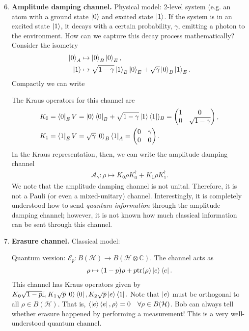 \documentclass[../../note.tex]{subfiles}
\begin{document}
\begin{enumerate}
\setcounter{enumi}{5}
    \item \textbf{Amplitude damping channel.} Physical model: 2-level system (e.g. an atom with a ground state $\ket{0}$ and excited state $\ket{1}$. If the system is in an excited state $\ket{1}$, it decays with a certain probability, $\gamma$, emitting a photon to the environment. How can we capture this decay process mathematically? Consider the isometry 
    \begin{align}
        \ket{0}_A &\mapsto \ket{0}_B \ket{0}_E,\\
        \ket{1} &\mapsto \sqrt{1-\gamma} \ket{1}_B \ket{0}_E +\sqrt{\gamma}\ket{0}_B\ket{1}_E.
    \end{align}
Compactly we can write

The Kraus operators for this channel are 
\begin{align}
    K_0 &=\bra{0}_E V = \ket{0}\bra{0}_B + \sqrt{1-\gamma} \ket{1}\bra{1})_B = \begin{pmatrix}
    1 & 0 \\
    0 & \sqrt{1-\gamma}
    \end{pmatrix},\\
     K_1&= \bra{1}_E V = \sqrt{\gamma}\ket{0}_B\bra{1}_A = \begin{pmatrix}
    0 & \gamma \\
    0 & 0
    \end{pmatrix}.
\end{align}
In the Kraus representation, then, we can write the amplitude damping channel 
\begin{align}
    \mathcal{A}_{\gamma}: \rho \mapsto K_0 \rho K_0^{\dagger} + K_1 \rho K_1^{\dagger}.
\end{align}
We note that the amplitude damping channel is not unital. Therefore, it is not a Pauli (or even a mixed-unitary) channel. Interestingly, it is completely understood how to send \textit{quantum information} through the amplitude damping channel; however, it is not known how much classical information can be sent through this channel.
\item \textbf{Erasure channel.} Classical model:

Quantum version: $\mathcal{E}_p: B(\mathcal{H}) \rightarrow B(\mathcal{H} \otimes \mathbb{C})$. The channel acts as
\begin{align}
    \rho \mapsto (1-p) \rho + p \text{tr}(\rho) \ket{e}\bra{e}.
\end{align}
This channel has Kraus operators given by $K_0 \sqrt{1-p} \mathbb{I}, K_1 \sqrt{p}\ket{0}\bra{0}, K_2 \sqrt{p} \ket{e}\bra{1}.$ Note that $\ket{e}$ must be orthogonal to all $\rho \in B(\mathcal{H})$. That is, $\braket{\ket{e}\bra{e},\rho}=0 \quad \forall \rho \in B(\mathcal{H})$. Bob can always tell whether erasure happened by performing a measurement! This is a very well-understood quantum channel.
\end{enumerate}
\end{document}
